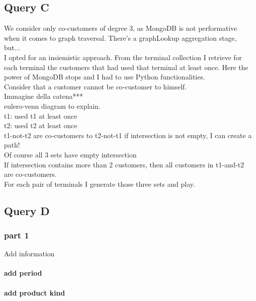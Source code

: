 \documentclass[runningheads]{llncs}
\begin{document}
\subsection{Query C}
We consider only co-customers of degree 3, as MongoDB is not performative when it comes to graph traversal. There's a graphLookup aggregation stage, but...\\
I opted for an insiemistic approach. From the terminal collection I retrieve for each terminal the customers that had used that terminal at least once. Here the power of MongoDB stops and I had to use Python functionalities.\\
Consider that a customer cannot be co-customer to himself.\\
Immagine della catena***\\
eulero-venn diagram to explain.\\
t1: used t1 at least once\\
t2: used t2 at least once\\
t1-not-t2 are co-customers to t2-not-t1 if intersection is not empty,
I can create a path!\\
Of course all 3 sets have empty intersection\\
If intersection contains more than 2 customers, then all customers in t1-and-t2 are co-customers.\\
For each pair of terminals I generate those three sets and play.
\subsection{Query D}
\subsubsection{part 1}
Add information
\paragraph{add period}
\paragraph{add product kind}
\end{document}

